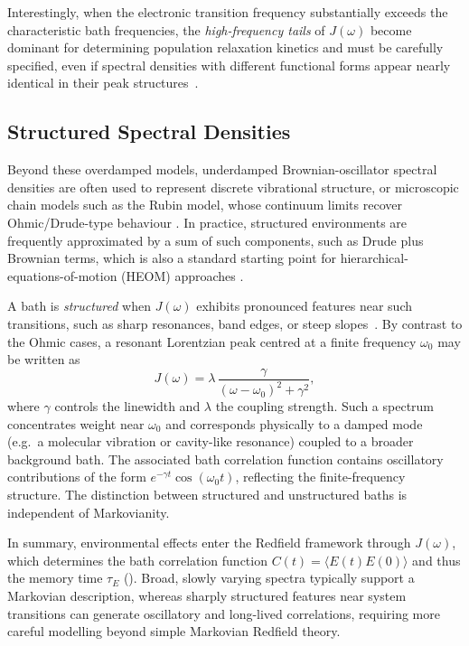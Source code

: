 Interestingly, when the electronic transition frequency substantially exceeds the characteristic bath frequencies, the \emph{high-frequency tails} of $J(\omega)$ become dominant for determining population relaxation kinetics and must be carefully specified, even if spectral densities with different functional forms appear nearly identical in their peak structures~\cite{koroletal2025highfrequencytailsspectral}.


\subsection{Structured Spectral Densities}

Beyond these overdamped models, underdamped Brownian-oscillator spectral densities are often used to represent discrete vibrational structure, or microscopic chain models such as the Rubin model, whose continuum limits recover Ohmic/Drude-type behaviour \cite{thingna2013steadystatetransportproperties, dasetal2020quantumbrownianmotion}. In practice, structured environments are frequently approximated by a sum of such components, such as Drude plus Brownian terms, which is also a standard starting point for hierarchical-equations-of-motion (HEOM) approaches \cite{tanimura2012reducedhierarchyequations,lambertetal2023qutipbofinbosonicfermionic}.

A bath is \emph{structured} when $J(\omega)$ exhibits pronounced features near such transitions, such as sharp resonances, band edges, or steep slopes~\cite{breuerpetruccione2007theoryopenquantum}. 
By contrast to the Ohmic cases, a resonant Lorentzian peak centred at a finite frequency $\omega_0$ may be written as
\begin{equation*}
  J(\omega) 
  = \lambda \, \frac{\gamma}{(\omega-\omega_0)^2 + \gamma^2},
\end{equation*}
where $\gamma$ controls the linewidth and $\lambda$ the coupling strength. 
Such a spectrum concentrates weight near $\omega_0$ and corresponds physically to a damped mode (e.g.\ a molecular vibration or cavity-like resonance) coupled to a broader background bath. 
The associated bath correlation function contains oscillatory contributions of the form $e^{-\gamma t}\cos(\omega_0 t)$, reflecting the finite-frequency structure.
The distinction between structured and unstructured baths is independent of Markovianity. 

\medskip
In summary, environmental effects enter the Redfield framework through $J(\omega)$, which determines the bath correlation function $C(t)=\langle E(t)E(0)\rangle$ and thus the memory time $\tau_E$ (). 
Broad, slowly varying spectra typically support a Markovian description, whereas sharply structured features near system transitions can generate oscillatory and long-lived correlations, requiring more careful modelling beyond simple Markovian Redfield theory.
